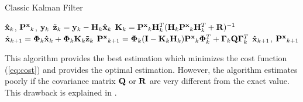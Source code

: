 \begin{algorithm}[H]
\caption{Classic Kalman Filter}
\begin{algorithmic}[1]
\label{al:KF}
\REQUIRE ${\bf \hat x}_k$, ${\bf P^x}_{k}$, ${\bf y}_k$
\STATE $\tilde {\bf z}_k = {\bf y}_k - {\bf H}_k{\bf \hat x}_k$
\STATE ${\bf K}_k = {\bf P^x}_k{\bf H}^T_k({\bf H}_k{\bf P^x}_k{\bf H}^T_k+{\bf R})^{-1}$
\STATE $\hat{\bf x}_{k+1} = \bm{\Phi}_k{\bf \hat x}_k+\bm{\Phi}_k{\bf K}_k{\bf \tilde z}_k$
\STATE ${\bf P^x}_{k+1} = \bm{\Phi}_k({\bf I}-{\bf K}_k{\bf H}_k){\bf P^x}_k\bm{\Phi}^T_k + \bm{\Gamma}_k{\bf Q}\bm{\Gamma}_k^T$
\ENSURE ${\bf \hat x}_{k+1}$, ${\bf P^x}_{k+1}$
\end{algorithmic}
\end{algorithm}

This algorithm provides the best estimation which minimizes the cost function (\ref{eq:cost}) and provides the optimal estimation. However, the algorithm estimates poorly if the covariance matrix ${\bf Q}$ or ${\bf R}$ are very different from the exact value. This drawback is explained in \cite{Sangsuk-Iam1990}.